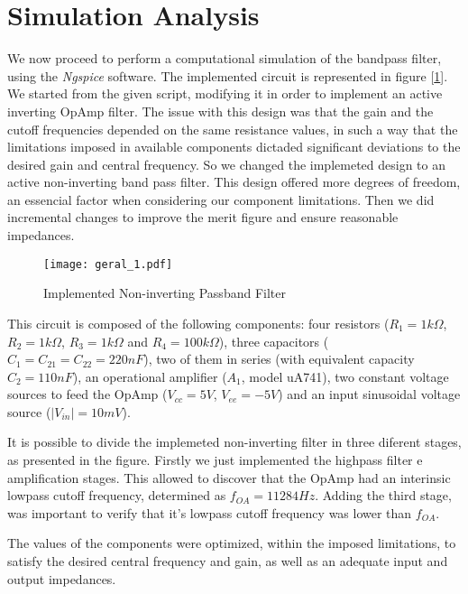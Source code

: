 \section{Simulation Analysis}
\label{sec:simulation}

\par We now proceed to perform a computational simulation of the bandpass filter, using the \textit{Ngspice} software. The implemented circuit is represented in figure [\ref{fig:Non-inv_Passband}]. We started from the given script, modifying it in order to implement an active inverting OpAmp filter. The issue with this design was that the gain and the cutoff frequencies depended on the same resistance values, in such a way that the limitations imposed in available components dictaded significant deviations to the desired gain and central frequency. So we changed the implemeted design to an active non-inverting band pass filter. This design offered more degrees of freedom, an essencial factor when considering our component limitations. Then we did incremental changes to improve the merit figure and ensure reasonable impedances.

 \begin{figure}[H]
 \centering
   \texttt{[image: geral\_1.pdf]}
   \caption{Implemented Non-inverting Passband Filter}
   \label{fig:Non-inv_Passband}
 \end{figure}

\par This circuit is composed of the following components: four resistors ($R_{1}=1k\Omega$, $R_{2}=1k\Omega$, $R_{3}=1k\Omega$ and $R_{4}=100k\Omega$), three capacitors ($C_1 = C_{21} = C_{22} = 220 nF$), two of them in series (with equivalent capacity $C_2 = 110nF$), an operational amplifier ($A_1$, model uA741), two constant voltage sources to feed the OpAmp ($V_{cc}=5V$, $V_{ee} = -5V$) and an input sinusoidal voltage source ($|V_{in}| = 10mV$).

\par It is possible to divide the implemeted non-inverting filter in three diferent stages, as presented in the figure. Firstly we just implemented the highpass filter e amplification stages. This allowed to discover that the OpAmp had an interinsic lowpass cutoff frequency, determined as $f_{OA} = 11 284 Hz$. Adding the third stage, was important to verify that it's lowpass cutoff frequency was lower than $f_{OA}$.


\par The values of the components were optimized, within the imposed limitations, to satisfy the desired central frequency and gain, as well as an adequate input and output impedances.

